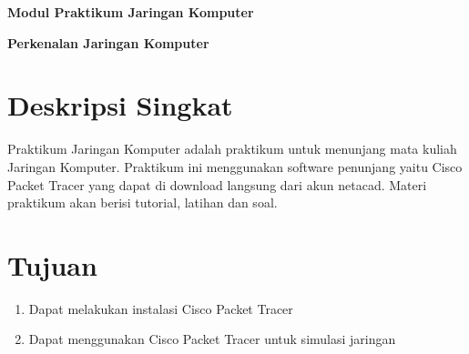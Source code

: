 \documentclass{article}
\begin{document}
    \begin{center}  
        \textbf{Modul Praktikum Jaringan Komputer}

        \textbf{Perkenalan Jaringan Komputer}
    \end{center}

    \section*{Deskripsi Singkat}
    Praktikum Jaringan Komputer adalah praktikum untuk menunjang mata kuliah Jaringan Komputer.
    Praktikum ini menggunakan software penunjang yaitu Cisco Packet Tracer yang dapat di download langsung dari akun netacad.
    Materi praktikum akan berisi tutorial, latihan dan soal.
   

    \section*{Tujuan}
    \begin{enumerate}
        \item Dapat melakukan instalasi Cisco Packet Tracer
        \item Dapat menggunakan Cisco Packet Tracer untuk simulasi jaringan
    \end{enumerate}
\end{document}
